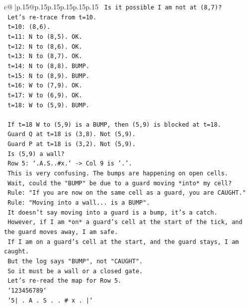 \documentclass{article}
\begin{document}
{\begin{supertabular}{c@{$\;$}|p{.15\linewidth}@{}p{.15\linewidth}p{.15\linewidth}p{.15\linewidth}p{.15\linewidth}p{.15\linewidth}}
{{{\texttt{  Is it possible I am not at (8,7)?} \\
\texttt{  Let's re{-}trace from t=10.} \\
\texttt{  t=10: (8,6).} \\
\texttt{  t=11: N to (8,5). OK.} \\
\texttt{  t=12: N to (8,6). OK.} \\
\texttt{  t=13: N to (8,7). OK.} \\
\texttt{  t=14: N to (8,8). BUMP.} \\
\texttt{  t=15: N to (8,9). BUMP.} \\
\texttt{  t=16: W to (7,9). OK.} \\
\texttt{  t=17: W to (6,9). OK.} \\
\texttt{  t=18: W to (5,9). BUMP.} \\
\\ 
\texttt{  If t=18 W to (5,9) is a BUMP, then (5,9) is blocked at t=18.} \\
\texttt{  Guard Q at t=18 is (3,8). Not (5,9).} \\
\texttt{  Guard P at t=18 is (3,2). Not (5,9).} \\
\texttt{  Is (5,9) a wall?} \\
\texttt{  Row 5: `.A.S..\#x.` {-}> Col 9 is '.'.} \\
\texttt{  This is very confusing. The bumps are happening on open cells.} \\
\texttt{  Wait, could the "BUMP" be due to a guard moving *into* my cell?} \\
\texttt{  Rule: "If you are now on the same cell as a guard, you are CAUGHT."} \\
\texttt{  Rule: "Moving into a wall... is a BUMP".} \\
\texttt{  It doesn't say moving into a guard is a bump, it's a catch.} \\
\texttt{  However, if I am *on* a guard's cell at the start of the tick, and the guard moves away, I am safe.} \\
\texttt{  If I am on a guard's cell at the start, and the guard stays, I am caught.} \\
\texttt{  But the log says "BUMP", not "CAUGHT".} \\
\texttt{  So it must be a wall or a closed gate.} \\
\texttt{  Let's re{-}read the map for Row 5.} \\
\texttt{  `123456789`} \\
\texttt{  `5| . A . S . . \# x . |`} \\
}}}
\end{supertabular}}
\end{document}
